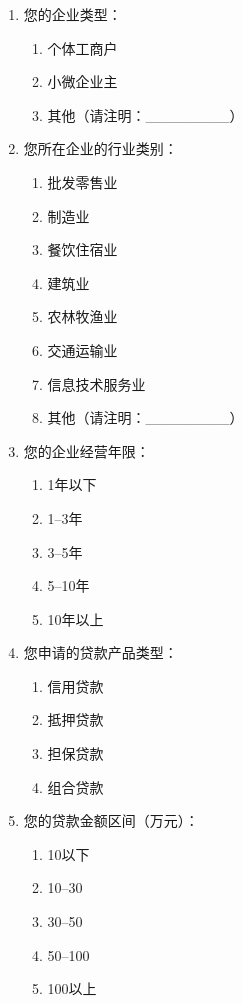 \vspace{1em}
\begin{enumerate}[label=\arabic*.,leftmargin=2em]
  \item 您的企业类型：
  \begin{enumerate}[label=(\Alph*),leftmargin=2em]
    \item 个体工商户
    \item 小微企业主
    \item 其他（请注明：\_\_\_\_\_\_\_\_）
  \end{enumerate}

  \item 您所在企业的行业类别：
  \begin{enumerate}[label=(\Alph*),leftmargin=2em]
    \item 批发零售业
    \item 制造业
    \item 餐饮住宿业
    \item 建筑业
    \item 农林牧渔业
    \item 交通运输业
    \item 信息技术服务业
    \item 其他（请注明：\_\_\_\_\_\_\_\_）
  \end{enumerate}

  \item 您的企业经营年限：
  \begin{enumerate}[label=(\Alph*),leftmargin=2em]
    \item 1年以下
    \item 1--3年
    \item 3--5年
    \item 5--10年
    \item 10年以上
  \end{enumerate}

  \item 您申请的贷款产品类型：
  \begin{enumerate}[label=(\Alph*),leftmargin=2em]
    \item 信用贷款
    \item 抵押贷款
    \item 担保贷款
    \item 组合贷款
  \end{enumerate}

  \item 您的贷款金额区间（万元）：
  \begin{enumerate}[label=(\Alph*),leftmargin=2em]
    \item 10以下
    \item 10--30
    \item 30--50
    \item 50--100
    \item 100以上
  \end{enumerate}


\end{enumerate}
